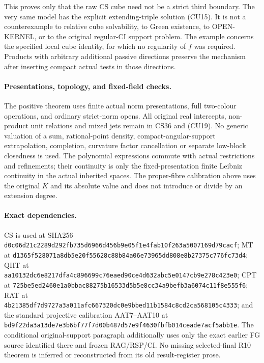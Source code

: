 This proves only that the raw CS cube need not be a strict third
boundary.  The very same model has the explicit extending-triple
solution (CU15).  It is not a counterexample to relative cube
solvability, to Green existence, to OPEN-KERNEL, or to the original
regular-CI support problem.  The example concerns the specified
local cube identity, for which no regularity of $f$ was required.
Products with arbitrary additional passive directions preserve the
mechanism after inserting compact actual tests in those directions.

\paragraph{Presentations, topology, and fixed-field checks.}
The positive theorem uses finite actual norm presentations, full
two-colour operations, and ordinary strict-norm opens.  All original
real intercepts, non-product unit relations and mixed jets remain in
CS36 and (CU19).  No generic valuation of a sum, rational-point
density, compact-angular-support extrapolation, completion, curvature
factor cancellation or separate low-block closedness is used.
The polynomial expressions commute with actual restrictions and
refinements; their continuity is only the fixed-presentation finite
Leibniz continuity in the actual inherited spaces.  The proper-fibre
calibration above uses the original $K$ and its absolute value and
does not introduce or divide by an extension degree.

\paragraph{Exact dependencies.}
CS is used at SHA256
\texttt{d0c06d21c2289d292fb735d6966d456b9e05f1e4fab10f263a5007169d79cacf};
MT at
\texttt{d1365f528071a8db5e20f55628c88b84a06e73965dd808e8b27375c776fc73d4};
QHT at
\texttt{aa10132dc6e8217dfa4c896699c76eaed90ce4d632abc5e0147cb9e278c423e0};
CPT at
\texttt{725be5ed2460e1a0bbac88275b16533d5b5e8cc34a9befb3a6074c11f8e555f6};
RAT at
\texttt{4b21385df7d9727a3a011afc667320dc0e9bbed11b1584c8cd2ca568105c4333};
and the standard projective calibration AAT7--AAT10 at
\texttt{bd9f22da3a13de7e3b6bf77f7d00b487d57e9f4630fbfb014ceade7acf5abb1e}.
The conditional original-support paragraph additionally uses only
the exact earlier FG source identified there and frozen RAG/RSP/CI.
No missing selected-final R10 theorem is inferred or reconstructed
from its old result-register prose.
